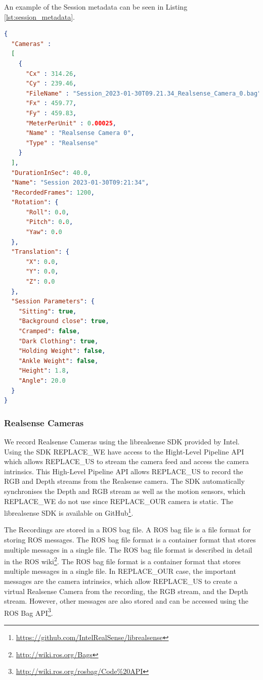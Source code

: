 An example of the Session metadata can be seen in Listing \ref{lst:session_metadata}.

\begin{lstlisting}[language=json,
                   firstnumber=1,
                   caption={[Example of session metadata]{Example of the Session metadata with a single Realsense Camera which was recorded for 40 seconds at around 30 frames per second resulting in 1200 frames. Some values have been changed to increase readability.}},
                   label={lst:session_metadata}]
{
  "Cameras" : 
  [
    {
      "Cx" : 314.26,
      "Cy" : 239.46,
      "FileName" : "Session_2023-01-30T09.21.34_Realsense_Camera_0.bag",
      "Fx" : 459.77,
      "Fy" : 459.83,
      "MeterPerUnit" : 0.00025,
      "Name" : "Realsense Camera 0",
      "Type" : "Realsense"
    }
  ],
  "DurationInSec": 40.0,
  "Name": "Session 2023-01-30T09:21:34",
  "RecordedFrames": 1200,
  "Rotation": {
      "Roll": 0.0,
      "Pitch": 0.0,
      "Yaw": 0.0
  },
  "Translation": {
      "X": 0.0,
      "Y": 0.0,
      "Z": 0.0
  },
  "Session Parameters": {
    "Sitting": true,
    "Background close": true,
    "Cramped": false,
    "Dark Clothing": true,
    "Holding Weight": false,
    "Ankle Weight": false,
    "Height": 1.8,
    "Angle": 20.0
  }
}
\end{lstlisting}

\subsubsection{Realsense Cameras}

We record Realsense Cameras using the librealsense SDK provided by Intel. Using the SDK REPLACE_WE have access to the Hight-Level Pipeline API which allows REPLACE_US to stream the camera feed and access the camera intrinsics. This High-Level Pipeline API allows REPLACE_US to record the RGB and Depth streams from the Realsense camera. The SDK automatically synchronises the Depth and RGB stream as well as the motion sensors, which REPLACE_WE do not use since REPLACE_OUR camera is static. The librealsense SDK is available on GitHub\footnote{\url{https://github.com/IntelRealSense/librealsense}}.

The Recordings are stored in a ROS bag file. A ROS bag file is a file format for storing ROS messages. The ROS bag file format is a container format that stores multiple messages in a single file. The ROS bag file format is described in detail in the ROS wiki\footnote{\url{http://wiki.ros.org/Bags}}. The ROS bag file format is a container format that stores multiple messages in a single file. In REPLACE_OUR case, the important messages are the camera intrinsics, which allow REPLACE_US to create a virtual Realsense Camera from the recording, the RGB stream, and the Depth stream. However, other messages are also stored and can be accessed using the ROS Bag API\footnote{\url{http://wiki.ros.org/rosbag/Code\%20API}}.

